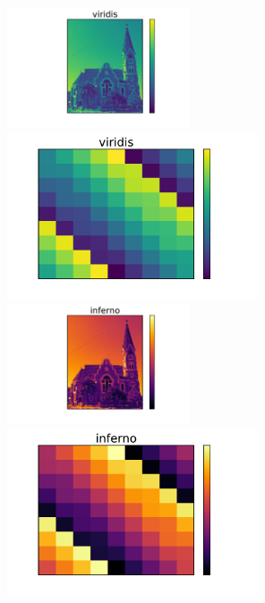 \documentclass{beamer}
\begin{document}
\begin{frame}
\begin{columns}
\begin{column}{0.5\textwidth}
\end{column}
\begin{column}{0.5\textwidth}
\begin{center}
\vfill
\includegraphics[width=0.42\textwidth]{../church_viridis.pdf}
\includegraphics[width=0.58\textwidth]{../magicsquare_viridis.pdf}\newline\newline
\vfill
\includegraphics[width=0.42\textwidth]{../church_inferno.pdf}
\includegraphics[width=0.58\textwidth]{../magicsquare_inferno.pdf}
\vfill
\end{center}
\end{column}
\end{columns}
\end{frame}
\end{document}
